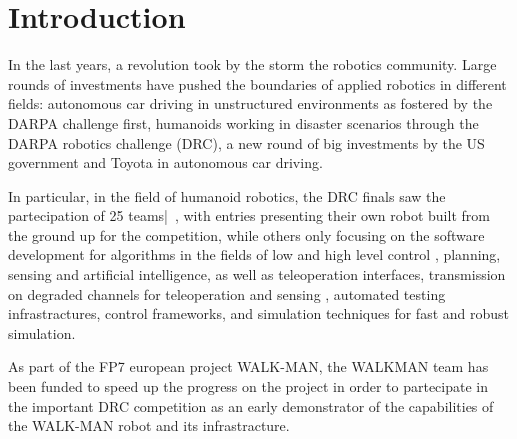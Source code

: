 \documentclass[%
	paper=A4,					%
	twoside=true,				%
	openright,			.
	parskip=full,				%
	chapterprefix=true,			%
	11pt,						%
	headings=normal,			%
	bibliography=totoc,			%
	listof=totoc,				%
	titlepage=on,				%
	captions=tableabove,		%
	draft=true,				%
]{scrreprt}%
\begin{document}

\pagestyle{empty}				%
\cleardoublepage

\pagestyle{plain}				%
\cleardoublepage
%
\setcounter{tocdepth}{2}		%
\tableofcontents				%
\cleardoublepage

\setcounter{page}{1}			%
\pagestyle{maincontentstyle} 	%

\chapter{Introduction}
In the last years, a revolution took by the storm the robotics community. Large rounds of investments have pushed the boundaries of applied robotics in different fields: autonomous car driving in unstructured environments as fostered by the DARPA challenge first, humanoids working in disaster scenarios through the DARPA robotics challenge (DRC), a new round of big investments by the US government and Toyota in autonomous car driving.

In particular, in the field of humanoid robotics,  the DRC finals saw the partecipation of 25 teams|~\cite{DRC-what-happened}, with entries presenting their own robot built from the ground up for the competition, while others only focusing on the software development for algorithms in the fields of low and high level control \cite{beeson15, feng2015-rj, feng2015-oj}, planning, sensing and artificial intelligence, as well as teleoperation interfaces, transmission on degraded channels for teleoperation and sensing \cite{fallon2015-ni}, automated testing infrastractures, control frameworks, and simulation techniques for fast and robust simulation.

As part of the FP7 european project WALK-MAN, the WALKMAN team has been funded to speed up the progress on the project in order to partecipate in the important DRC competition as an early demonstrator of the capabilities of the WALK-MAN robot and its infrastracture.
\end{document}
